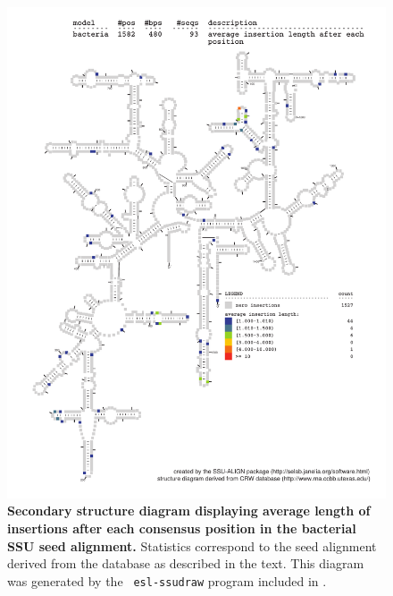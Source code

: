 \begin{figure}
\begin{center}
\includegraphics[width=5.7in]{Figures/bacteria-0p1-iavglen}
\end{center}
\caption[Secondary structure diagram displaying average length of insertions
  after each consensus position in the bacterial SSU seed
  alignment]{\textbf{Secondary structure diagram displaying average
    length of insertions after each consensus position in the bacterial SSU seed
  alignment.} Statistics correspond to the  seed
  alignment derived from the  database \cite{CannoneGutell02}
  as described in the text. This diagram was generated by the {\tt
  esl-ssudraw} program included in .}
\label{fig:baciavglen}
\end{figure}


